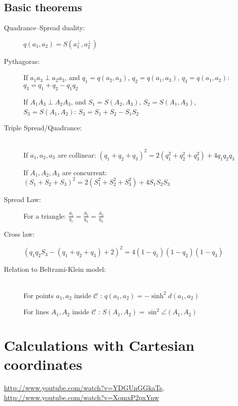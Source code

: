 \documentclass[DIV16,halfparskip]{scrartcl}
\newcommand{\nullcm}{\mathcal C}
\newcommand{\nullconic}{$\nullcm$ }
\begin{document}
\subsection{Basic theorems}
\begin{description}
    \item [Quadrance--Spread duality:] \( q(a_1,a_2) = S(a_1^\perp,a_2^\perp) \)

    \item [Pythagoras:] If $a_1a_3 \perp a_2a_3$, and $q_1 = q(a_2,a_3)$,
        $q_2 = q(a_1,a_3)$, $q_3 = q(a_1,a_2)$:
        \( q_3 = q_1 + q_2 - q_1q_2 \)

    If $A_1A_3 \perp A_2A_3$, and $S_1 = S(A_2,A_3)$,
        $S_2 = S(A_1,A_3)$, $S_3 = S(A_1,A_2)$:
        \( S_3 = S_1 + S_2 - S_1S_2 \)

    \item [Triple Spread/Quadrance:]\hfill\\
        If $a_1, a_2, a_3$ are collinear:
        \( (q_1+q_2+q_3)^2 = 2(q_1^2+q_2^2+q_3^2) + 4q_1q_2q_3 \)

        If $A_1, A_2, A_3$ are concurrent:
        \( (S_1+S_2+S_3)^2 = 2(S_1^2+S_2^2+S_3^2) + 4S_1S_2S_3 \)

    \item [Spread Law:] For a triangle: $\frac{S_1}{q_1} = \frac{S_2}{q_2} = \frac{S_3}{q_3}$  

    \item [Cross law:] $(q_1q_2S_3 - (q_1 + q_2 + q_3) + 2)^2 = 4(1-q_1)(1-q_2)(1-q_3)$

    \item [Relation to Beltrami-Klein model:]\hfill\\
        For points $a_1, a_2$ inside \nullconic:
        \( q(a_1,a_2) = -\sinh^2 d(a_1,a_2) \)

        For lines $A_1, A_2$ inside \nullconic:
        \( S(A_1,A_2) = \sin^2 \angle(A_1,A_2) \)
\end{description}

\section{Calculations with Cartesian coordinates}
\url{http://www.youtube.com/watch?v=YDGUnGGkaTs}, \url{http://www.youtube.com/watch?v=XomxP2pxYnw}
\end{document}
